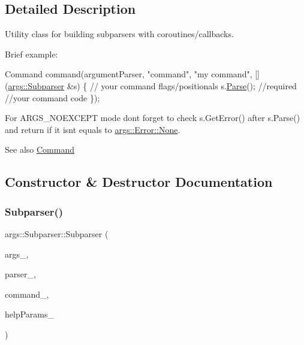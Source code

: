 \subsection{Detailed Description}
Utility class for building subparsers with coroutines/callbacks.

Brief example\+: 
\begin{DoxyCode}
Command command(argumentParser, \textcolor{stringliteral}{"command"}, \textcolor{stringliteral}{"my command"}, [](\hyperlink{classargs_1_1_subparser}{args::Subparser} &s)
\{
     \textcolor{comment}{// your command flags/positionals}
     s.\hyperlink{classargs_1_1_subparser_a9a21d184d749d4b5d8b6bddd4c5fda33}{Parse}(); \textcolor{comment}{//required}
     \textcolor{comment}{//your command code}
\});
\end{DoxyCode}


For A\+R\+G\+S\+\_\+\+N\+O\+E\+X\+C\+E\+PT mode don\textquotesingle{}t forget to check {\ttfamily s.\+Get\+Error()} after {\ttfamily s.\+Parse()} and return if it isn\textquotesingle{}t equals to \hyperlink{namespaceargs_aa530c0f95194aa275f49a5f299ac9e77a6adf97f83acf6453d4a6a4b1070f3754}{args\+::\+Error\+::\+None}.

\begin{DoxySeeAlso}{See also}
\hyperlink{classargs_1_1_command}{Command} 
\end{DoxySeeAlso}


\subsection{Constructor \& Destructor Documentation}
\mbox{\label{classargs_1_1_subparser_a64ec29a58edf8dc13191d564d44c0e56}} 
\subsubsection{\texorpdfstring{Subparser()}{Subparser()}\hspace{0.1cm}{\footnotesize\ttfamily [1/4]}}
{\footnotesize\ttfamily args\+::\+Subparser\+::\+Subparser (\begin{DoxyParamCaption}\item[{std\+::vector$<$ std\+::string $>$}]{args\+\_\+,  }\item[{\hyperlink{classargs_1_1_argument_parser}{Argument\+Parser} \&}]{parser\+\_\+,  }\item[{const \hyperlink{classargs_1_1_command}{Command} \&}]{command\+\_\+,  }\item[{const \hyperlink{structargs_1_1_help_params}{Help\+Params} \&}]{help\+Params\+\_\+ }\end{DoxyParamCaption})\hspace{0.3cm}{\ttfamily [inline]}}

